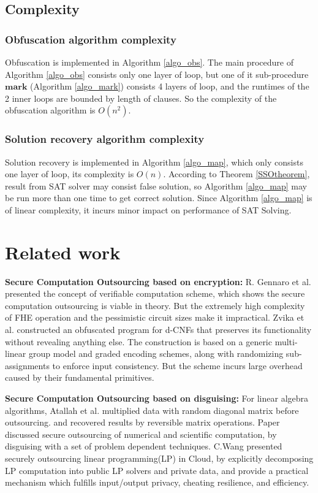 \documentclass[conference,compsocconf]{IEEEtran}
\begin{document}
\subsection{Complexity}
\subsubsection{Obfuscation algorithm complexity}
Obfuscation is implemented in Algorithm \ref{algo_obs}.
The main procedure of Algorithm \ref{algo_obs} consists only one layer of loop,
but one of it sub-procedure $\mathbf{mark}$ (Algorithm \ref{algo_mark}) consists 4 layers of loop, 
and the runtimes of the 2 inner loops are bounded by length of clauses.
So the complexity of the obfuscation algorithm is $O(n^2)$.

\subsubsection{Solution recovery algorithm complexity}
Solution recovery is implemented in  Algorithm \ref{algo_map}, 
which only consists one layer of loop, 
its complexity is $O(n)$.
According to Theorem \ref{SSOtheorem}, result from SAT solver may consist false solution,
so Algorithm \ref{algo_map} may be run more than one time to get correct solution.
Since Algorithm \ref{algo_map} is of linear complexity,
it incurs minor impact on performance of SAT Solving.

\section{Related work}
\textbf{Secure Computation Outsourcing based on encryption:}
R. Gennaro et al.\cite{R.Gennaro} presented the concept of verifiable computation scheme,
which shows the secure computation outsourcing is viable in theory.
But the extremely high complexity of FHE operation and the pessimistic circuit sizes make it impractical.
Zvika et al.\cite{OBfuscationd-CNFs} constructed an obfuscated program for d-CNFs that preserves its functionality without revealing anything else.
The construction is based on a generic multi-linear group model and graded encoding schemes,
along with randomizing sub-assignments to enforce input consistency.
But the scheme incurs large overhead caused by their fundamental primitives.

\textbf{Secure Computation Outsourcing based on disguising:}
For linear algebra algorithms,
Atallah et al. \cite{t19} multiplied data with random diagonal matrix before outsourcing.
and recovered results by reversible matrix operations.
Paper \cite{t20} discussed secure outsourcing of numerical and scientific computation,
by disguising with a set of problem dependent techniques.
C.Wang\cite{c.WANG} presented securely outsourcing linear programming(LP) in Cloud,
by explicitly decomposing LP computation into public LP solvers and private data,
and provide a practical mechanism which fulfills input/output privacy,
cheating resilience, and efficiency.
\end{document}

